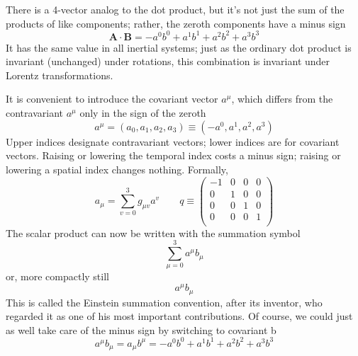 \documentclass[../main.tex]{subfiles}
\begin{document}
There is a 4-vector analog to the dot product, but it’s not just the sum of the products of like components; rather, the zeroth components have a minus sign
\begin{equation*}
\mathbf{A}\cdot\mathbf{B}=-a^0b^0+ a^1b^1+ a^2b^2+ a^3b^3
\end{equation*}
It has the same value in all inertial systems; just as the ordinary dot product is invariant (unchanged) under rotations, this combination is invariant under Lorentz transformations. 

It is convenient to introduce the covariant vector $a^\mu$, which differs from the contravariant $a^\mu$ only in the sign of the zeroth
\begin{equation*}
a^\mu= (a_0, a_1, a_2, a_3) \equiv (-a^0, a^1, a^2, a^3)
\end{equation*}
Upper indices designate contravariant vectors; lower indices are for covariant vectors. Raising or lowering the temporal index costs a minus sign; raising or lowering a spatial index changes nothing. Formally,
\begin{equation*}
    a_\mu=\sum_{v=0}^{3}g_{\mu v}a^v\qquad q\equiv
    \begin{pmatrix}
        -1&0&0&0\\
        0&1&0&0\\
        0&0&1&0\\
        0&0&0&1\\
    \end{pmatrix}
\end{equation*}
The scalar product can now be written with the summation symbol
\begin{equation*}
    \sum_{\mu=0}^{3}a^\mu b_\mu
\end{equation*}
or, more compactly still
\begin{equation*}
    a^\mu b_\mu
\end{equation*}
This is called the Einstein summation convention, after its inventor, who regarded it as one of his most important contributions. Of course, we could just as well take care of the minus sign by switching to covariant b
\begin{equation*}
    a^\mu b_\mu = a_\mu b^\mu = -a^0b^0 + a^1b^1 + a^2b^2 + a^3b^3
\end{equation*}
\end{document}
